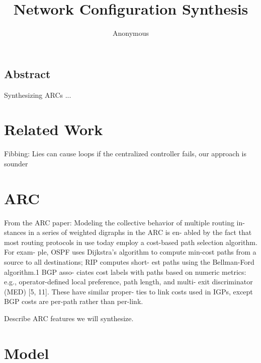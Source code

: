 \documentclass{hotnets16}
\begin{document}
 {}
\date{}


\title{Network Configuration Synthesis}

\author{Anonymous}

\maketitle


\subsection*{Abstract}

Synthesizing ARCs ...



\section{Related Work}

Fibbing: Lies can cause loops if the centralized controller fails,
our approach is sounder



\section{ARC}
From the ARC paper:
Modeling the collective behavior of multiple routing in- stances in a series of weighted digraphs in the ARC is en- abled by the fact that most routing protocols in use today employ a cost-based path selection algorithm. For exam- ple, OSPF uses Dijkstra’s algorithm to compute min-cost paths from a source to all destinations; RIP computes short- est paths using the Bellman-Ford algorithm.1 BGP asso- ciates cost labels with paths based on numeric metrics: e.g., operator-defined local preference, path length, and multi- exit discriminator (MED) [5, 11]. These have similar proper- ties to link costs used in IGPs, except BGP costs are per-path rather than per-link.


Describe ARC features we will synthesize.

\section{Model}
\end{document}
